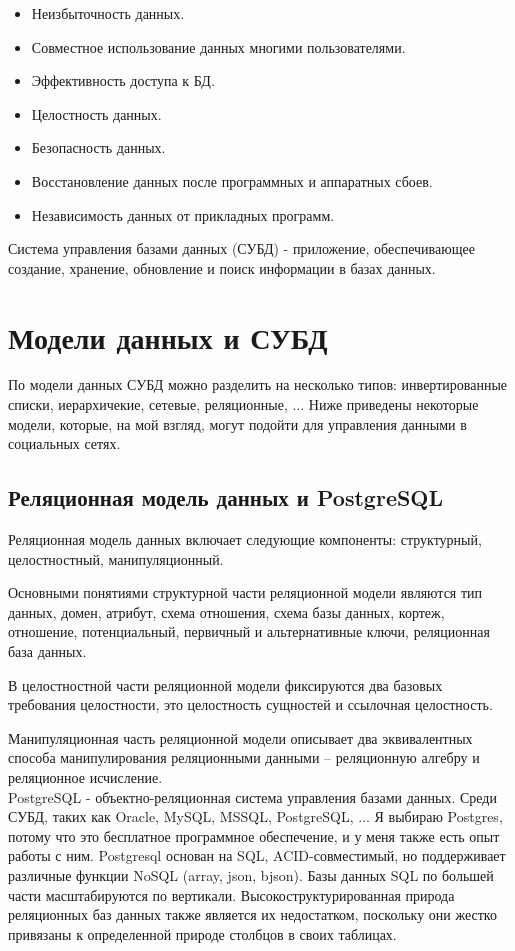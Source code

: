 \begin{itemize}
  \setlength{\itemsep}{0em}
  \item Неизбыточность данных.
  \item Совместное использование данных многими пользователями.
  \item Эффективность доступа к БД.
  \item Целостность данных.
  \item Безопасность данных.
  \item Восстановление данных после программных и аппаратных сбоев.
  \item Независимость данных от прикладных программ.
\end{itemize}

Система управления базами данных (СУБД) - приложение, обеспечивающее создание, хранение, обновление и поиск информации в базах данных.


\section{Модели данных и СУБД}

По модели данных СУБД можно разделить на несколько типов: инвертированные списки, иерархичекие, сетевые, реляционные, ...
Ниже приведены некоторые модели, которые, на мой взгляд, могут подойти для управления данными в социальных сетях.


\subsection*{Реляционная модель данных и PostgreSQL}

Реляционная модель данных включает следующие компоненты:
структурный, целостностный, манипуляционный.

Основными понятиями структурной части реляционной модели являются тип данных, домен, атрибут, схема
отношения, схема базы данных, кортеж, отношение, потенциальный, первичный и альтернативные ключи, реляционная
база данных.

В целостностной части реляционной модели фиксируются два базовых требования целостности, это целостность сущностей и ссылочная целостность.

Манипуляционная часть реляционной модели описывает два эквивалентных способа манипулирования реляционными
данными – реляционную алгебру и реляционное исчисление.
\\

PostgreSQL - объектно-реляционная система управления базами данных.
Среди СУБД, таких как Oracle, MySQL, MSSQL, PostgreSQL, ... Я выбираю Postgres, потому что это бесплатное программное обеспечение, и у меня также есть опыт работы с ним.
Postgresql основан на SQL, ACID-совместимый, но поддерживает различные функции NoSQL (array, json, bjson).
Базы данных SQL по большей части масштабируются по вертикали.
Высокоструктурированная природа реляционных баз данных также является их недостатком, поскольку они жестко привязаны к определенной природе столбцов в своих таблицах.


